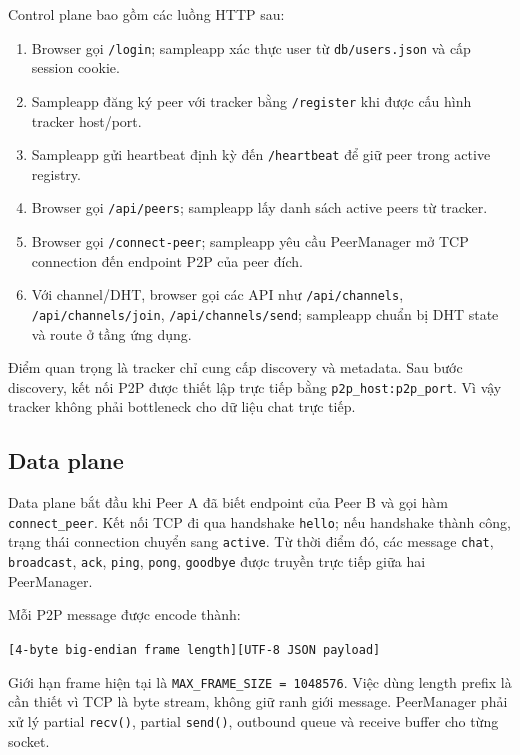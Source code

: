 Control plane bao gồm các luồng HTTP sau:
\begin{enumerate}[leftmargin=2em]
    \item Browser gọi \texttt{/login}; sampleapp xác thực user từ \texttt{db/users.json} và cấp session cookie.
    \item Sampleapp đăng ký peer với tracker bằng \texttt{/register} khi được cấu hình tracker host/port.
    \item Sampleapp gửi heartbeat định kỳ đến \texttt{/heartbeat} để giữ peer trong active registry.
    \item Browser gọi \texttt{/api/peers}; sampleapp lấy danh sách active peers từ tracker.
    \item Browser gọi \texttt{/connect-peer}; sampleapp yêu cầu PeerManager mở TCP connection đến endpoint P2P của peer đích.
    \item Với channel/DHT, browser gọi các API như \texttt{/api/channels}, \texttt{/api/channels/join}, \texttt{/api/channels/send}; sampleapp chuẩn bị DHT state và route ở tầng ứng dụng.
\end{enumerate}

Điểm quan trọng là tracker chỉ cung cấp discovery và metadata. Sau bước discovery, kết nối P2P được thiết lập trực tiếp bằng \texttt{p2p\_host:p2p\_port}. Vì vậy tracker không phải bottleneck cho dữ liệu chat trực tiếp.

\subsection{Data plane}

Data plane bắt đầu khi Peer A đã biết endpoint của Peer B và gọi hàm \texttt{connect\_peer}. Kết nối TCP đi qua handshake \texttt{hello}; nếu handshake thành công, trạng thái connection chuyển sang \texttt{active}. Từ thời điểm đó, các message \texttt{chat}, \texttt{broadcast}, \texttt{ack}, \texttt{ping}, \texttt{pong}, \texttt{goodbye} được truyền trực tiếp giữa hai PeerManager.

Mỗi P2P message được encode thành:
\begin{center}
\texttt{[4-byte big-endian frame length][UTF-8 JSON payload]}
\end{center}

Giới hạn frame hiện tại là \texttt{MAX\_FRAME\_SIZE = 1048576}. Việc dùng length prefix là cần thiết vì TCP là byte stream, không giữ ranh giới message. PeerManager phải xử lý partial \texttt{recv()}, partial \texttt{send()}, outbound queue và receive buffer cho từng socket.

